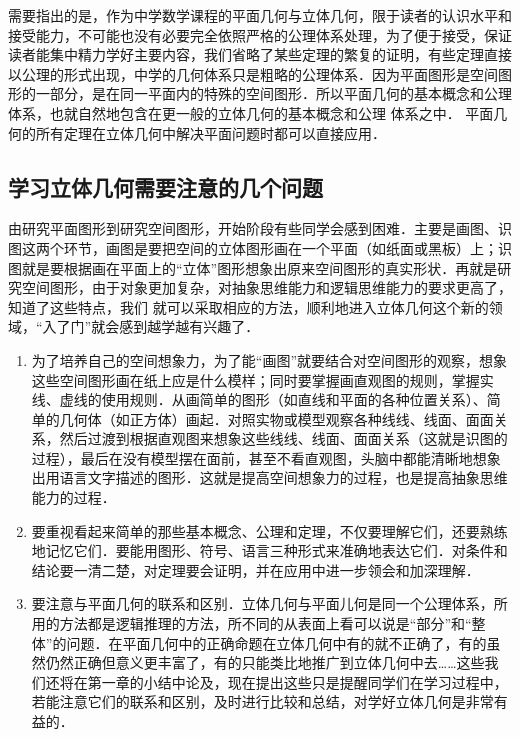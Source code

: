 需要指出的是，作为中学数学课程的平面几何与立体几何，限于读者的认识水平和接受能力，不可能也没有必要完全依照严格的公理体系处理，为了便于接受，保证读者能集中精力学好主要内容，我们省略了某些定理的繁复的证明，有些定理直接以公理的形式出现，中学的几何体系只是粗略的公理体系．因为平面图形是空间图形的一部分，是在同一平面内的特殊的空间图形．所以平面几何的基本概念和公理体系，也就自然地包含在更一般的立体几何的基本概念和公理
体系之中． 平面几何的所有定理在立体几何中解决平面问题时都可以直接应用．

\subsection*{学习立体几何需要注意的几个问题}
由研究平面图形到研究空间图形，开始阶段有些同学会感到困难．主要是画图、识图这两个环节，画图是要把空间的立体图形画在一个平面（如纸面或黑板）上；识图就是要根据画在平面上的“立体”图形想象出原来空间图形的真实形状．再就是研究空间图形，由于对象更加复杂，对抽象思维能力和逻辑思维能力的要求更高了，知道了这些特点，我们
就可以采取相应的方法，顺利地进入立体几何这个新的领域，“入了门”就会感到越学越有兴趣了．

\begin{enumerate}
    \item 为了培养自己的空间想象力，为了能“画图”就要结合对空间图形的观察，想象这些空间图形画在纸上应是什么模样；同时要掌握画直观图的规则，掌握实线、虚线的使用规则．从画简单的图形（如直线和平面的各种位置关系）、简单的几何体（如正方体）画起．对照实物或模型观察各种线线、线面、面面关系，然后过渡到根据直观图来想象这些线线、线面、面面关系（这就是识图的过程），最后在没有模型摆在面前，甚至不看直观图，头脑中都能清晰地想象出用语言文字描述的图形．这就是提高空间想象力的过程，也是提高抽象思维能力的过程．
    \item 要重视看起来简单的那些基本概念、公理和定理，不仅要理解它们，还要熟练地记忆它们．要能用图形、符号、语言三种形式来准确地表达它们．对条件和结论要一清二楚，对定理要会证明，并在应用中进一步领会和加深理解．
    \item 要注意与平面几何的联系和区别．立体几何与平面儿何是同一个公理体系，所用的方法都是逻辑推理的方法，所不同的从表面上看可以说是“部分”和“整体”的问题．在平面几何中的正确命题在立体几何中有的就不正确了，有的虽然仍然正确但意义更丰富了，有的只能类比地推广到立体几何中去……这些我们还将在第一章的小结中论及，现在提出这些只是提醒同学们在学习过程中，若能注意它们的联系和区别，及时进行比较和总结，对学好立体几何是非常有益的．
\end{enumerate}




